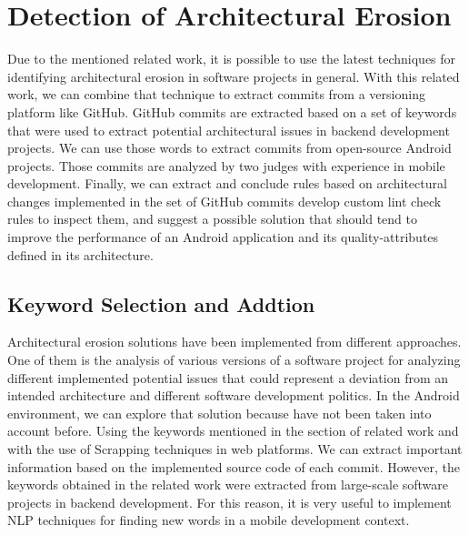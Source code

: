 \chapter{Detection of Architectural Erosion}
\label{cha:iaer}

Due to the mentioned related work, it is possible to use the latest techniques for identifying architectural erosion in software projects in general. With this related work, we can combine that technique to extract commits from a versioning platform like GitHub. GitHub commits are extracted based on a set of keywords that were used to extract potential architectural issues in backend development projects. We can use those words to extract commits from open-source Android projects. Those commits are analyzed by two judges with experience in mobile development.  Finally, we can extract and conclude rules based on architectural changes implemented in the set of GitHub commits develop custom lint check rules to inspect them, and suggest a possible solution that should tend to improve the performance of an Android application and its quality-attributes defined in its architecture. 

\section{Keyword Selection and Addtion}
Architectural erosion solutions have been implemented from different approaches. One of them is the analysis of various versions of a software project for analyzing different implemented potential issues that could represent a deviation from an intended architecture and different software development politics. In the Android environment, we can explore that solution because have not been taken into account before. Using the keywords mentioned in the section of related work and with the use of Scrapping techniques in web platforms. We can extract important information based on the implemented source code of each commit. However, the keywords obtained in the related work were extracted from large-scale software projects in backend development. For this reason, it is very useful to implement NLP techniques for finding new words in a mobile development context. 

